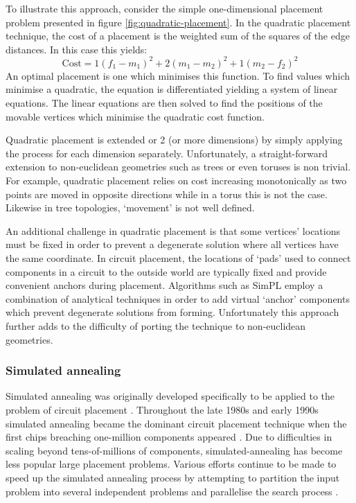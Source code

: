 				To illustrate this approach, consider the simple one-dimensional
				placement problem presented in figure \ref{fig:quadratic-placement}.
				In the quadratic placement technique, the cost of a placement is the
				weighted sum of the squares of the edge distances. In this case this
				yields:
				\begin{equation*}
					\textrm{Cost} = 1(f_1 - m_1)^2 + 2(m_1 - m_2)^2 + 1(m_2 - f_2)^2
				\end{equation*}
				An optimal placement is one which minimises this function. To find
				values which minimise a quadratic, the equation is differentiated
				yielding a system of linear equations. The linear equations are then
				solved to find the positions of the movable vertices which minimise the
				quadratic cost function.
				
				Quadratic placement is extended or 2 (or more dimensions) by simply
				applying the process for each dimension separately. Unfortunately, a
				straight-forward extension to non-euclidean geometries such as trees or
				even toruses is non trivial. For example, quadratic placement relies on
				cost increasing monotonically as two points are moved in opposite
				directions while in a torus this is not the case. Likewise in tree
				topologies, `movement' is not well defined.
				
				An additional challenge in quadratic placement is that some vertices'
				locations must be fixed in order to prevent a degenerate solution where
				all vertices have the same coordinate. In circuit placement, the
				locations of `pads' used to connect components in a circuit to the
				outside world are typically fixed and provide convenient anchors during
				placement. Algorithms such as SimPL \cite{kim12b} employ a combination
				of analytical techniques in order to add virtual `anchor' components
				which prevent degenerate solutions from forming. Unfortunately this
				approach further adds to the difficulty of porting the technique to
				non-euclidean geometries.
				
			
			\subsubsection{Simulated annealing}
				
				Simulated annealing was originally developed specifically to be applied
				to the problem of circuit placement \cite{kirkpatrick83}. Throughout
				the late 1980s and early 1990s simulated annealing became the dominant
				circuit placement technique when the first chips breaching one-million
				components appeared \cite{betz97,sechen85}.  Due to difficulties in
				scaling beyond tens-of-millions of components, simulated-annealing has
				become less popular large placement problems.  Various efforts continue
				to be made to speed up the simulated annealing process by attempting to
				partition the input problem into several independent problems
				\cite{choong10,haldar00} and parallelise the search process
				\cite{ludwin08}.
				
